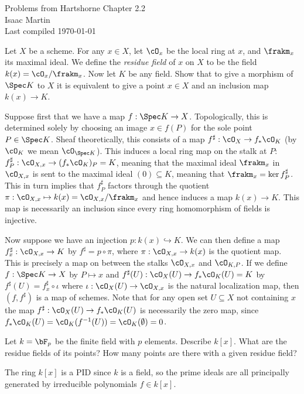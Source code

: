 


\pagestyle{empty}
	\LARGE
\begin{center}
	Problems from Hartshorne Chapter 2.2 \\
	\Large
	Isaac Martin \\
    Last compiled \today
\end{center}
\normalsize
\vspace{-2mm}
\hru
\begin{homework}[e]
	 Let $X$ be a scheme. For any $x \in X$, let $\cO_x$ be the local ring at $x$, and $\frakm_x$ its maximal ideal. We define the \emph{residue field} of $x$ on $X$ to be the field $k(x) = \cO_x/\frakm_x$. Now let $K$ be any field. Show that to give a morphism of $\Spec K$ to $X$ it is equivalent to give a point $x \in X$ and an inclusion map $k(x) \to K$.
	\begin{prf}
		Suppose first that we have a map $f:\Spec K \to X$. Topologically, this is determined solely by choosing an image $x\in f(P)$ for the sole point $P\in \Spec K$. Sheaf theoretically, this consists of a map $f^\sharp:\cO_X \to f_*\cO_K$ (by $\cO_K$ we mean $\cO_{\Spec K}$). This induces a local ring map on the stalk at $P$: $f^\sharp_P:\cO_{X,x}\to (f_*\cO_{K})_P = K$, meaning that the maximal ideal $\frakm_x$ in $\cO_{X,x}$ is sent to the maximal ideal $(0) \subseteq K$, meaning that $\frakm_x = \ker f^\sharp_P$. This in turn implies that $f^{\sharp}_P$ factors through the quotient $\pi:\cO_{X,x} \mapsto k(x) = \cO_{X,x}/\frakm_x$ and hence induces a map $k(x) \to K$. This map is necessarily an inclusion since every ring homomorphism of fields is injective.

		Now suppose we have an injection $p:k(x) \hookrightarrow K$. We can then define a map $f^\sharp_x:\cO_{X,x}\to K$ by $f^{\sharp} = p\circ \pi$, where $\pi:\cO_{X,x}\to k(x)$ is the quotient map. This is precisely a map on between the stalks $\cO_{X,x}$ and $\cO_{K,P}$. If we define $f:\Spec K\to X$ by $P\mapsto x$ and $f^\sharp(U):\cO_X(U) \to f_*\cO_K(U) = K$ by $f^\sharp(U) = f^{\sharp}_x \circ \iota$ where $\iota:\cO_X(U) \to \cO_{X,x}$ is the natural localization map, then $(f,f^\sharp)$ is a map of schemes. Note that for any open set $U \subseteq X$ not containing $x$ the map $f^\sharp:\cO_X(U)\to f_*\cO_K(U)$ is necessarily the zero map, since $f_*\cO_K(U) = \cO_K(f^{-1}(U)) = \cO_K(\emptyset) = 0$.
	\end{prf}
	 Let $k = \bF_p$ be the finite field with $p$ elements. Describe $k[x]$. What are the residue fields of its points? How many points are there with a given residue field?
	\begin{prf}
		The ring $k[x]$ is a PID since $k$ is a field, so the prime ideals are all principally generated by irreducible polynomials $f \in k[x]$.
	\end{prf}
\end{homework}

